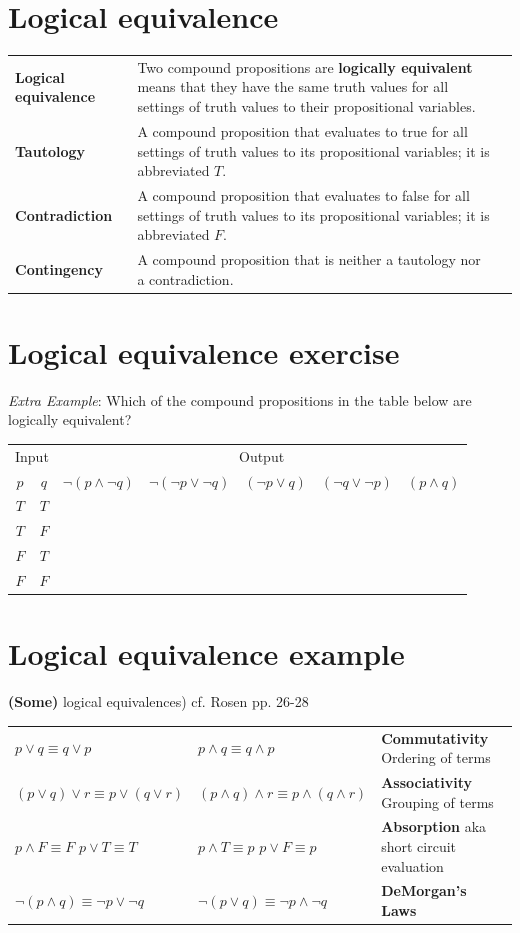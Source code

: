 \documentclass[12pt, oneside]{article}
\begin{document}
\section*{Logical equivalence}


\begin{tabular}{lp{4in}p{2in}}
{\bf Logical equivalence } &Two compound  propositions are {\bf logically  equivalent} means that  they 
have the  same  truth  values for all settings of truth  values to their propositional  variables.\\
{\bf Tautology} & A compound proposition that evaluates to true
for all settings of truth  values to its propositional  variables; it is  abbreviated $T$.\\
{\bf Contradiction} & A compound proposition that  evaluates  to  false 
for  all settings of truth  values to its propositional  variables; it  is abbreviated $F$.\\
{\bf Contingency} & A compound proposition that is neither a tautology nor a contradiction.\\
\end{tabular}
 \vfill
\section*{Logical equivalence exercise}


{\it Extra Example}: Which of the  compound propositions in the table below are logically equivalent?
\begin{center}
\begin{tabular}{cc||c|c|c|c|c}
\multicolumn{2}{c||}{Input}  & \multicolumn{5}{c}{Output} \\
$p$ & $q$ & $\lnot (p \land \lnot q)$ & $\lnot (\lnot p  \lor \lnot q)$ &  $(\lnot p \lor  q)$
& $(\lnot q \lor \lnot p)$ & $(p \land q)$  \\
\hline
$T$ & $T$ & &&&&\\
$T$ & $F$ & &&&&\\
$F$ & $T$ & &&&&\\
$F$ & $F$ & &&&&\\
\end{tabular}
\end{center} \vfill
\section*{Logical equivalence example}


{\bf (Some)} logical equivalences) cf. Rosen pp. 26-28

\begin{tabular}{llp{3in}}
$p \lor q \equiv q \lor p$ & $p \land q \equiv q \land p$ & {\bf Commutativity} Ordering of terms\\
$(p \lor q) \lor r  \equiv p \lor (q \lor r)$ & $(p \land q) \land r  \equiv p \land (q \land r)$ & {\bf Associativity} Grouping of terms\\
$p \land F \equiv F$ \qquad $p \lor T \equiv T$ & $p \land T \equiv p$ \qquad $p \lor F \equiv p$ & {\bf Absorption} aka 
short circuit evaluation\\
$\lnot (p \land q) \equiv \lnot p \lor \lnot q$ & $\lnot (p \lor q) \equiv \lnot p \land\lnot q$  & {\bf DeMorgan's Laws}\end{tabular}
\end{document}

